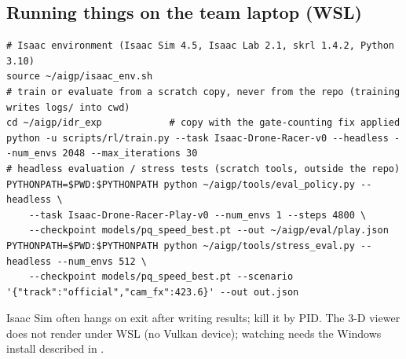 \documentclass[10pt,a4paper]{article}
\newcommand{\code}[1]{\texttt{\detokenize{#1}}}
\begin{document}
\subsection{Running things on the team laptop (WSL)}
\begin{lstlisting}
# Isaac environment (Isaac Sim 4.5, Isaac Lab 2.1, skrl 1.4.2, Python 3.10)
source ~/aigp/isaac_env.sh
# train or evaluate from a scratch copy, never from the repo (training writes logs/ into cwd)
cd ~/aigp/idr_exp            # copy with the gate-counting fix applied
python -u scripts/rl/train.py --task Isaac-Drone-Racer-v0 --headless --num_envs 2048 --max_iterations 30
# headless evaluation / stress tests (scratch tools, outside the repo)
PYTHONPATH=$PWD:$PYTHONPATH python ~/aigp/tools/eval_policy.py --headless \
    --task Isaac-Drone-Racer-Play-v0 --num_envs 1 --steps 4800 \
    --checkpoint models/pq_speed_best.pt --out ~/aigp/eval/play.json
PYTHONPATH=$PWD:$PYTHONPATH python ~/aigp/tools/stress_eval.py --headless --num_envs 512 \
    --checkpoint models/pq_speed_best.pt --scenario '{"track":"official","cam_fx":423.6}' --out out.json
\end{lstlisting}
Isaac Sim often hangs on exit after writing results; kill it by PID. The 3-D viewer does not render under WSL (no Vulkan device); watching needs the Windows install described in \code{ISAACSIM.md}.

\end{document}
